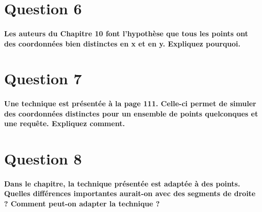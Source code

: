 \documentclass{article}
\begin{document}
\section{Question 6}
    \paragraph{Les auteurs du Chapitre 10 font l’hypothèse que tous les points ont des coordonnées bien
distinctes en x et en y. Expliquez pourquoi.}

\section{Question 7}
    \paragraph{Une technique est présentée à la page 111. Celle-ci permet de simuler des coordonnées
distinctes pour un ensemble de points quelconques et une requête. Expliquez comment.}

\section{Question 8}
    \paragraph{Dans le chapitre, la technique présentée est adaptée à des points. Quelles différences
    importantes aurait-on avec des segments de droite ? Comment peut-on adapter la technique ?}
\end{document}
